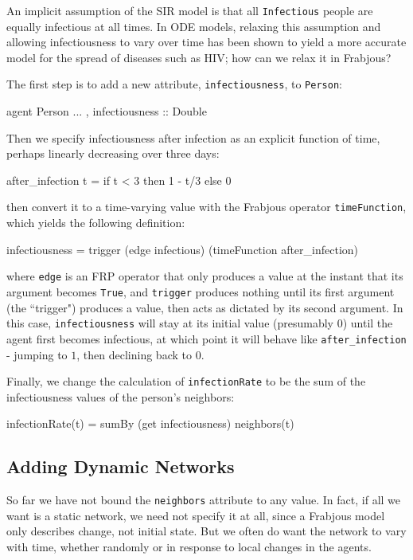 \documentclass[oribibl]{llncs}
\begin{document}
  An implicit assumption of the SIR model is that all \lstinline{Infectious} people are equally infectious at all times. In ODE models, relaxing this assumption and allowing infectiousness to vary over time has been shown to yield a more accurate model for the spread of diseases such as HIV\cite{hiv_contact_patterns}; how can we relax it in Frabjous? 

 The first step is to add a new attribute, \lstinline{infectiousness}, to \lstinline{Person}: 
\begin{code}
	agent Person { ... , infectiousness :: Double} 
\end{code}

Then we specify infectiousness after infection as an explicit function of time, perhaps linearly decreasing over three days: 
\begin{code}
	after_infection t =  if t < 3 then 1 - t/3 else 0 
\end{code}
then convert it to a time-varying value with the Frabjous operator \lstinline{timeFunction}, which yields the following definition:
\begin{code}
	infectiousness = trigger (edge infectious) 
			 	 (timeFunction after_infection)
\end{code}
where \lstinline{edge} is an FRP operator that only produces a value at the instant that its argument becomes \lstinline{True}, and \lstinline{trigger} produces nothing until its first argument (the ``trigger") produces a value, then acts as dictated by its second argument. In this case, \lstinline{infectiousness} will stay at its initial value (presumably $0$) until the agent first becomes infectious, at which point it will behave like \lstinline{after_infection} - jumping to $1$, then declining back to $0$. 

 Finally, we change the calculation of \lstinline{infectionRate} to be the sum of the infectiousness values of the person's neighbors:
\begin{code}
	infectionRate(t) = sumBy (get infectiousness) neighbors(t) 
\end{code}
\subsection{Adding Dynamic Networks}

 So far we have not bound the \lstinline{neighbors} attribute to any value. In fact, if all we want is a static network, we need not specify it at all, since a Frabjous model only describes change, not initial state. But we often do want the network to vary with time, whether randomly or in response to local changes in the agents. 
\end{document}
